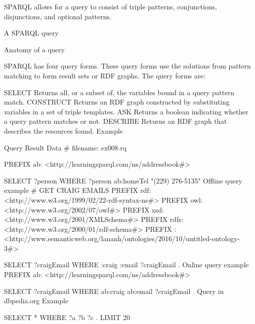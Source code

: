 SPARQL allows for a query to consist of triple patterns, conjunctions, disjunctions, and optional patterns.

A SPARQL query


Anatomy of a query


SPARQL has four query forms. These query forms use the solutions from pattern matching to form result sets or RDF graphs. The query forms are:

SELECT
Returns all, or a subset of, the variables bound in a query pattern match.
CONSTRUCT
Returns an RDF graph constructed by substituting variables in a set of triple templates.
ASK
Returns a boolean indicating whether a query pattern matches or not.
DESCRIBE
Returns an RDF graph that describes the resources found.
Example

Query
Result
Data
# filename: ex008.rq

PREFIX ab: <http://learningsparql.com/ns/addressbook#>

SELECT ?person
WHERE
{ ?person ab:homeTel "(229) 276-5135"}
Offline query example
# GET CRAIG EMAILS
PREFIX rdf: <http://www.w3.org/1999/02/22-rdf-syntax-ns#>
PREFIX owl: <http://www.w3.org/2002/07/owl#>
PREFIX xsd: <http://www.w3.org/2001/XMLSchema#>
PREFIX rdfs: <http://www.w3.org/2000/01/rdf-schema#>
PREFIX : <http://www.semanticweb.org/lananh/ontologies/2016/10/untitled-ontology-3#>

SELECT ?craigEmail
WHERE
{ :craig :email ?craigEmail . }
Online query example
PREFIX ab: <http://learningsparql.com/ns/addressbook#>

SELECT ?craigEmail
WHERE
{ ab:craig ab:email ?craigEmail . }
Query in dbpedia.org
Example

SELECT * WHERE {
 ?a ?b ?c .
} LIMIT 20